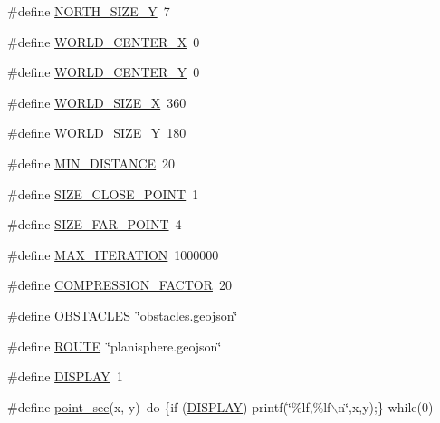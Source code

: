 \begin{DoxyCompactItemize}
\#define \hyperlink{a00016_aeebc2f024b71e1c7e21a4aa84df6c658_aeebc2f024b71e1c7e21a4aa84df6c658}{\-N\-O\-R\-T\-H\-\_\-\-S\-I\-Z\-E\-\_\-\-Y}~7
\item 
\#define \hyperlink{a00016_aea54516d126e26f705a90f2554088aa7_aea54516d126e26f705a90f2554088aa7}{\-W\-O\-R\-L\-D\-\_\-\-C\-E\-N\-T\-E\-R\-\_\-\-X}~0
\item 
\#define \hyperlink{a00016_a2df4ec3ebf3dfb2571bad3b77c71362d_a2df4ec3ebf3dfb2571bad3b77c71362d}{\-W\-O\-R\-L\-D\-\_\-\-C\-E\-N\-T\-E\-R\-\_\-\-Y}~0
\item 
\#define \hyperlink{a00016_a0b8180d45b4f486b0376164e8d4236d4_a0b8180d45b4f486b0376164e8d4236d4}{\-W\-O\-R\-L\-D\-\_\-\-S\-I\-Z\-E\-\_\-\-X}~360
\item 
\#define \hyperlink{a00016_ace6bb03745896c34e3d7d2c6ab92cb3b_ace6bb03745896c34e3d7d2c6ab92cb3b}{\-W\-O\-R\-L\-D\-\_\-\-S\-I\-Z\-E\-\_\-\-Y}~180
\item 
\#define \hyperlink{a00016_a549d41dcf9444ed7d6df1da3c73e7d16_a549d41dcf9444ed7d6df1da3c73e7d16}{\-M\-I\-N\-\_\-\-D\-I\-S\-T\-A\-N\-C\-E}~20
\item 
\#define \hyperlink{a00016_a84b7254ec9a316504fdaffaf572f5c90_a84b7254ec9a316504fdaffaf572f5c90}{\-S\-I\-Z\-E\-\_\-\-C\-L\-O\-S\-E\-\_\-\-P\-O\-I\-N\-T}~1
\item 
\#define \hyperlink{a00016_a7abba20fa878f41f24a08abffde9b313_a7abba20fa878f41f24a08abffde9b313}{\-S\-I\-Z\-E\-\_\-\-F\-A\-R\-\_\-\-P\-O\-I\-N\-T}~4
\item 
\#define \hyperlink{a00016_aefa7672f40a44cb9b17c8fb46210d1fd_aefa7672f40a44cb9b17c8fb46210d1fd}{\-M\-A\-X\-\_\-\-I\-T\-E\-R\-A\-T\-I\-O\-N}~1000000
\item 
\#define \hyperlink{a00016_a0bfcf094f7b3bcaaa5ff91d287f07b51_a0bfcf094f7b3bcaaa5ff91d287f07b51}{\-C\-O\-M\-P\-R\-E\-S\-S\-I\-O\-N\-\_\-\-F\-A\-C\-T\-O\-R}~20
\item 
\#define \hyperlink{a00016_afd2b92c197f45f4b4f0787d4d0541c94_afd2b92c197f45f4b4f0787d4d0541c94}{\-O\-B\-S\-T\-A\-C\-L\-E\-S}~\char`\"{}obstacles.\-geojson\char`\"{}
\item 
\#define \hyperlink{a00016_a5b5cba0b0b9b73eb1ce8afda91fe7be7_a5b5cba0b0b9b73eb1ce8afda91fe7be7}{\-R\-O\-U\-T\-E}~\char`\"{}planisphere.\-geojson\char`\"{}
\item 
\#define \hyperlink{a00016_ab4bf926a45354a2f328f1a7b94ebd3c5_ab4bf926a45354a2f328f1a7b94ebd3c5}{\-D\-I\-S\-P\-L\-A\-Y}~1
\item 
\#define \hyperlink{a00016_abd5b73b8937670d0c501932fb4497d02_abd5b73b8937670d0c501932fb4497d02}{point\-\_\-see}(x, y)~do \{if (\hyperlink{a00016_ab4bf926a45354a2f328f1a7b94ebd3c5_ab4bf926a45354a2f328f1a7b94ebd3c5}{\-D\-I\-S\-P\-L\-A\-Y}) printf(\char`\"{}\%lf,\%lf$\backslash$n\char`\"{},x,y);\} while(0)

\end{DoxyCompactItemize}

